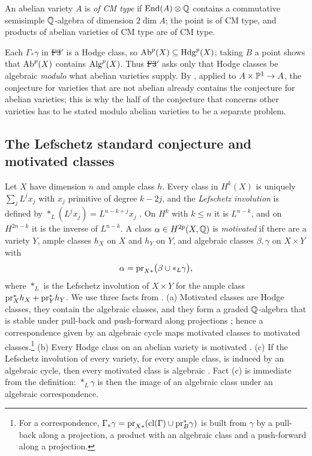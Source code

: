 An abelian variety $A$ is \emph{of CM type} if $\operatorname{End}(A)\otimes\mathbb{Q}$ contains a
commutative semisimple $\mathbb{Q}$-algebra of dimension $2\dim A$; the point is of
CM type, and products of abelian varieties of CM type are of CM type.

Each $\Gamma_{*}\gamma$ in \st{F3$'$} is a Hodge class, so
$\operatorname{Ab}^{p}(X)\subseteq\operatorname{Hdg}^{p}(X)$; taking $B$ a point shows that $\operatorname{Ab}^{p}(X)$
contains $\operatorname{Alg}^{p}(X)$. Thus \st{F3$'$} asks only that Hodge classes be
algebraic \emph{modulo} what abelian varieties supply. By
, applied to $A\times\mathbb{P}^{1}\to A$, the conjecture for
varieties that are not abelian already contains the conjecture for abelian
varieties; this is why the half of the conjecture that concerns other
varieties has to be stated modulo abelian varieties to be a separate
problem.

\subsection{The Lefschetz standard conjecture and motivated classes}

Let $X$ have dimension $n$ and ample class $h$. Every class in $H^{k}(X)$ is
uniquely $\sum_{j}L^{j}x_{j}$ with $x_{j}$ primitive of degree $k-2j$, and the
\emph{Lefschetz involution} is defined by $*_{L}(L^{j}x_{j})=L^{n-k+j}x_{j}$
\cite[\S1.1]{And96}. On $H^{k}$ with $k\le n$ it is $L^{n-k}$, and on
$H^{2n-k}$ it is the inverse of $L^{n-k}$. A class $\alpha\in H^{2p}(X,\mathbb{Q})$
is \emph{motivated} \cite[D\'efinition~1]{And96} if there are a variety $Y$,
ample classes $h_{X}$ on $X$ and $h_{Y}$ on $Y$, and algebraic classes
$\beta,\gamma$ on $X\times Y$ with
\[
  \alpha=\mathrm{pr}_{X*}\bigl(\beta\cup *_{L}\gamma\bigr),
\]
where $*_{L}$ is the Lefschetz involution of $X\times Y$ for the ample class
$\mathrm{pr}_{X}^{*}h_{X}+\mathrm{pr}_{Y}^{*}h_{Y}$.
We use three facts from \cite{And96}. (a) Motivated classes are Hodge
classes, they contain the algebraic classes, and they form a graded
$\mathbb{Q}$-algebra that is stable under pull-back and push-forward along
projections \cite[Proposition~2.1 and \S2.5]{And96}; hence a correspondence
given by an algebraic cycle maps motivated classes to motivated
classes.\footnote{For a correspondence, $\Gamma_{*}\gamma=\mathrm{pr}_{X*}(\operatorname{cl}
(\Gamma)\cup\mathrm{pr}_{B}^{*}\gamma)$ is built from $\gamma$ by a pull-back along a
projection, a product with an algebraic class and a push-forward along a
projection.} (b) Every Hodge class on an abelian variety is motivated
\cite[Th\'eor\`eme~0.6.2]{And96}. (c) If the Lefschetz involution of every
variety, for every ample class, is induced by an algebraic cycle, then every
motivated class is algebraic \cite[\S2, after D\'efinition~1]{And96}. Fact
(c) is immediate from the definition: $*_{L}\gamma$ is then the image of an
algebraic class under an algebraic correspondence.

